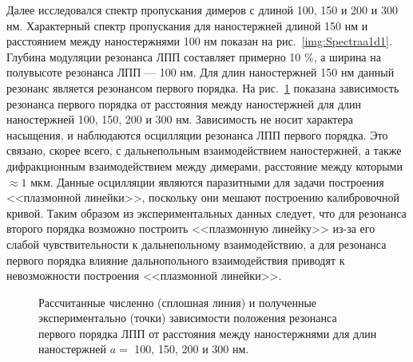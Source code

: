 Далее исследовался спектр пропускания димеров с длиной 100, 150 и 200 и 300 нм. Характерный спектр пропускания для наностержней длиной 150 нм и расстоянием между наностержнями 100 нм показан на рис.~\ref{img:Spectraa1d1}. Глубина модуляции резонанса ЛПП составляет примерно 10 \%, а ширина на полувысоте резонанса ЛПП --- 100 нм. Для длин наностержней 150 нм данный резонанс является резонансом первого порядка.
На рис.~\ref{img:1res} показана зависимость резонанса первого порядка от расстояния между наностержней для длин наностержней 100, 150, 200 и 300 нм. Зависимость не носит характера насыщения, и наблюдаются осцилляции резонанса ЛПП первого порядка. Это связано, скорее всего, с дальнепольным взаимодействием наностержней, а также дифракционным взаимодействием между димерами, расстояние между которыми $ \approx 1$ мкм. Данные осцилляции являются паразитными для задачи построения <<плазмонной линейки>>, поскольку они мешают построению калибровочной кривой. Таким образом из экспериментальных данных следует, что для резонанса второго порядка возможно построить <<плазмонную линейку>> из-за его слабой чувствительности к дальнепольному взаимодействию, а для резонанса первого порядка влияние дальнопольного взаимодействия приводят к невозможности построения <<плазмонной линейки>>.
\begin{figure}
\caption{Рассчитанные численно (сплошная линия) и полученные экспериментально (точки) зависимости положения резонанса первого порядка ЛПП от расстояния между наностержнями для длин наностержней $ a = $ 100, 150, 200 и 300 нм.}
\label{img:1res}
\end{figure}

